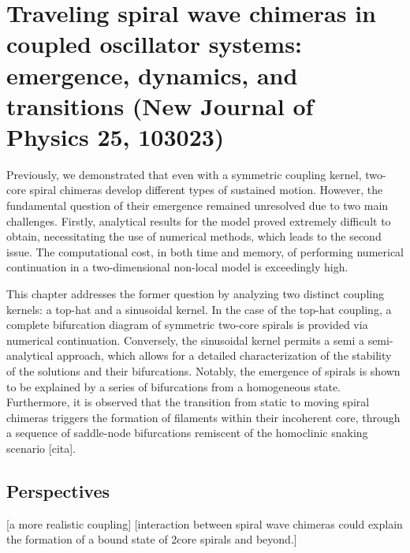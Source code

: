 \chapter{Traveling spiral wave chimeras in coupled
oscillator systems: emergence, dynamics, and
transitions (New Journal of Physics 25, 103023)}

Previously, we demonstrated that even with a symmetric coupling kernel, two-core spiral chimeras develop different
types of sustained motion. However, the fundamental question of their emergence remained
unresolved due to two main challenges. Firstly, analytical results for the model proved
extremely difficult to obtain, necessitating the use of numerical methods, which leads to the second 
issue. The computational cost, in both time
and memory, of performing numerical continuation in a two-dimensional non-local model is exceedingly high.

This chapter addresses the former question by analyzing two distinct coupling kernels: a
top-hat and a sinusoidal kernel. In the case of the top-hat coupling, a complete bifurcation diagram of symmetric two-core spirals
is provided via numerical continuation. Conversely, the sinusoidal kernel
permits a semi a semi-analytical approach, which allows for a detailed 
characterization of the stability of the solutions and their bifurcations. Notably,
the emergence of spirals is shown to be explained by a series of bifurcations from a homogeneous
state. Furthermore, it is observed that the transition from static to moving spiral chimeras
triggers the formation of filaments within their incoherent core, through a sequence of saddle-node
bifurcations remiscent of the homoclinic snaking scenario [cita]. 



\section{Perspectives}

[a more realistic coupling]
[interaction between spiral wave chimeras could explain the formation of a bound state of 
2core spirals and beyond.]